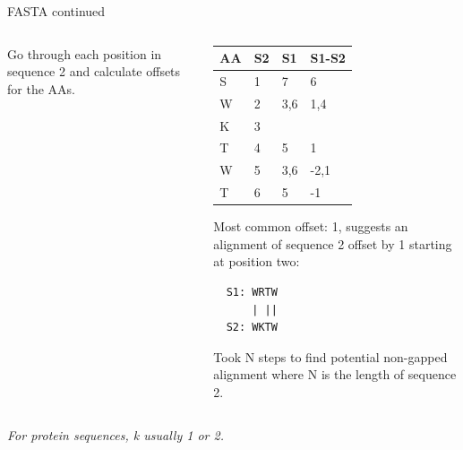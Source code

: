 \documentclass[pdf]{beamer}
\begin{document}
\begin{frame}[fragile]{FASTA continued}
\begin{columns}
\begin{column}[t]{0.5\textwidth}
      \vspace{2ex}
      Go through each position in sequence 2 and calculate offsets for the AAs.
      \end{column}
    \begin{column}[t]{0.5\textwidth}
      {\tiny
        \setlength{\tabcolsep}{0.5em}
        \begin{tabular}{l|ll|l}
          AA & S2 & S1 & S1-S2 \\
          \hline
          S & 1 & 7 & 6\\
          W & 2 & 3,6 & 1,4\\
          K & 3 & & \\
          T & 4 & 5 & 1\\
          W & 5 & 3,6 & -2,1\\
          T & 6 & 5 & -1\\
        \end{tabular}
      }
      \pause

      \vspace{2ex}
      {\small
      Most common offset: 1, suggests an alignment of sequence 2 offset by 1
      starting at position two:

\begin{verbatim}
  S1: WRTW
      | ||
  S2: WKTW      
\end{verbatim}
      
      Took N steps to find potential non-gapped alignment where N is the
      length of sequence 2.
    }
    \end{column}
  \end{columns}
  {\small
  \emph{For protein sequences, k usually 1 or 2.}
  }
\end{frame}
\end{document}
